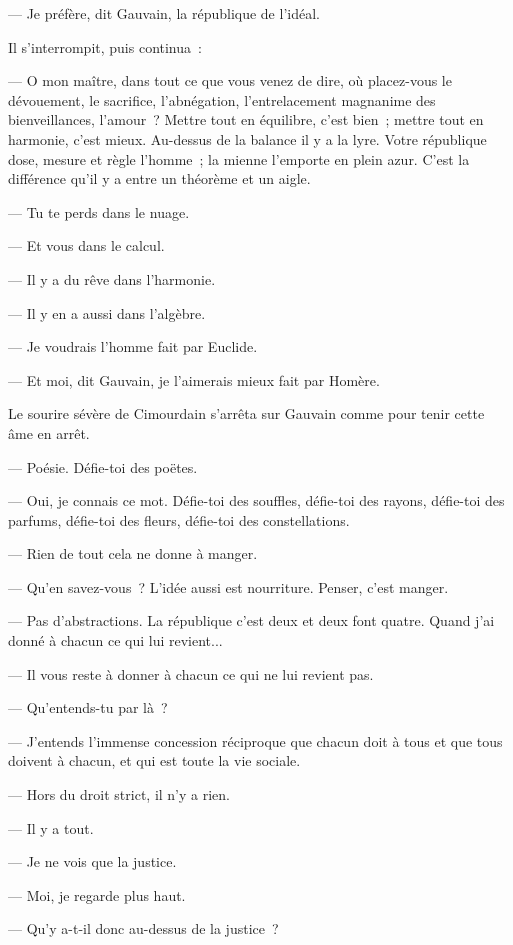 \documentclass[french,twoside]{book} %
\begin{document}
— Je préfère, dit Gauvain, la république de l’idéal.\par
Il s’interrompit, puis continua :\par
— O mon maître, dans tout ce que vous venez de dire, où placez-vous le dévouement, le sacrifice, l’abnégation, l’entrelacement magnanime des bienveillances, l’amour ? Mettre tout en équilibre, c’est bien ; mettre tout en harmonie, c’est mieux. Au-dessus de la balance il y a la lyre. Votre république dose, mesure et règle l’homme ; la mienne l’emporte en plein azur. C’est la différence qu’il y a entre un théorème et un aigle.\par
— Tu te perds dans le nuage.\par
— Et vous dans le calcul.\par
— Il y a du rêve dans l’harmonie.\par
— Il y en a aussi dans l’algèbre.\par
— Je voudrais l’homme fait par Euclide.\par
— Et moi, dit Gauvain, je l’aimerais mieux fait par Homère.\par
Le sourire sévère de Cimourdain s’arrêta sur Gauvain comme pour tenir cette âme en arrêt.\par
 — Poésie. Défie-toi des poëtes.\par
— Oui, je connais ce mot. Défie-toi des souffles, défie-toi des rayons, défie-toi des parfums, défie-toi des fleurs, défie-toi des constellations.\par
— Rien de tout cela ne donne à manger.\par
— Qu’en savez-vous ? L’idée aussi est nourriture. Penser, c’est manger.\par
— Pas d’abstractions. La république c’est deux et deux font quatre. Quand j’ai donné à chacun ce qui lui revient...\par
— Il vous reste à donner à chacun ce qui ne lui revient pas.\par
— Qu’entends-tu par là ?\par
— J’entends l’immense concession réciproque que chacun doit à tous et que tous doivent à chacun, et qui est toute la vie sociale.\par
— Hors du droit strict, il n’y a rien.\par
— Il y a tout.\par
— Je ne vois que la justice.\par
— Moi, je regarde plus haut.\par
— Qu’y a-t-il donc au-dessus de la justice ?\par
\end{document}
